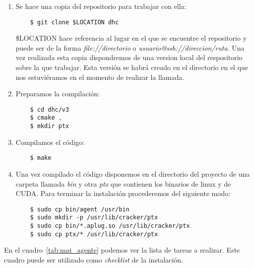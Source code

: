 \begin{enumerate}
	\item Se hace una copia del repositorio para trabajar con ella:
	
	\begin{verbatim}
	$ git clone $LOCATION dhc
	\end{verbatim}
	
	\$LOCATION hace referencia al lugar en el que se encuentre el repositorio y puede ser de la forma \emph{file://directorio} o \emph{usuario@ssh://direccion/ruta}. Una vez realizada esta copia dispondremos de una version local del respositorio sobre la que trabajar. Esta versión se habrá creado en el directorio en el que nos estuviéramos en el momento de realizar la llamada.
	
	\item Preparamos la compilación:
	
	\begin{verbatim}
	$ cd dhc/v3
	$ cmake .
	$ mkdir ptx
	\end{verbatim}
	
	\item Compilamos el código:
	
	\begin{verbatim}
	$ make
	\end{verbatim}
	
	\item Una vez compilado el código disponemos en el directorio del proyecto de una carpeta llamada \emph{bin} y otra \emph{ptx} que contienen los binarios de linux y de CUDA. Para terminar la instalación procederemos del siguiente modo:
	
	\begin{verbatim}
	$ sudo cp bin/agent /usr/bin
	$ sudo mkdir -p /usr/lib/cracker/ptx
	$ sudo cp bin/*.aplug.so /usr/lib/cracker/ptx
	$ sudo cp ptx/* /usr/lib/cracker/ptx
	\end{verbatim}
\end{enumerate}

En el cuadro~\ref{tab:mat_agente} podemos ver la lista de tareas a realizar. Este cuadro puede ser utilizado como \emph{checklist} de la instalación.

